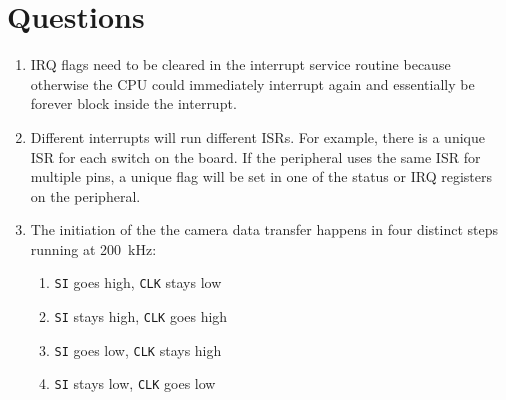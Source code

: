 \documentclass[CMPE]{../KGCOEReport}
\def\code#1{\texttt{#1}}
\begin{document}
	\section*{Questions}

	\begin{enumerate}
	\item
	IRQ flags need to be cleared in the interrupt service routine because otherwise
	the CPU could immediately interrupt again and essentially be forever block inside
	the interrupt.
	\item
	Different interrupts will run different ISRs. For example, there is a unique ISR for
	each switch on the board. If the peripheral uses the same ISR for multiple pins,
	a unique flag will be set in one of the status or IRQ registers on the peripheral.  
	\item
	The initiation of the the camera data transfer happens in four distinct steps
	running at \SI{200}{\kilo\Hz}:
	\begin{enumerate}
	\item \code{SI} goes high,
	      \code{CLK} stays low
	\item \code{SI} stays high,
		  \code{CLK} goes high
	\item \code{SI} goes low,
		  \code{CLK} stays high
	\item \code{SI} stays low,
		  \code{CLK} goes low
	\end{enumerate}
	\end{enumerate}
\end{document}

